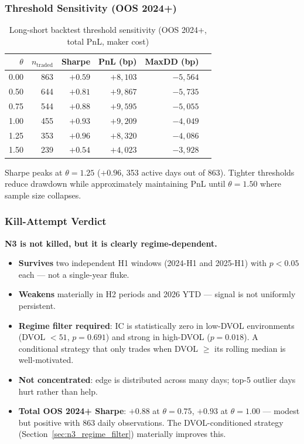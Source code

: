 \documentclass[12pt, a4paper]{article}
\theoremstyle{definition}
\begin{document}
\subsubsection{Threshold Sensitivity (OOS 2024+)}

\begin{table}[ht]
\centering
\caption{Long-short backtest threshold sensitivity (OOS 2024+, total PnL, maker cost)}
\label{tab:n3_thresh2}
\begin{tabular}{rrrrrr}
\toprule
$\theta$ & $n_{\text{traded}}$ & Sharpe & PnL (bp) & MaxDD (bp) \\
\midrule
0.00 & 863 & $+0.59$ & $+8{,}103$  & $-5{,}564$ \\
0.50 & 644 & $+0.81$ & $+9{,}867$  & $-5{,}735$ \\
0.75 & 544 & $+0.88$ & $+9{,}595$  & $-5{,}055$ \\
1.00 & 455 & $+0.93$ & $+9{,}209$  & $-4{,}049$ \\
1.25 & 353 & $+0.96$ & $+8{,}320$  & $-4{,}086$ \\
1.50 & 239 & $+0.54$ & $+4{,}023$  & $-3{,}928$ \\
\bottomrule
\end{tabular}
\end{table}

Sharpe peaks at $\theta = 1.25$ ($+0.96$, 353 active days out of 863).
Tighter thresholds reduce drawdown while approximately maintaining PnL
until $\theta = 1.50$ where sample size collapses.

\subsubsection{Kill-Attempt Verdict}

\textbf{N3 is not killed, but it is clearly regime-dependent.}

\begin{itemize}[noitemsep]
  \item \textbf{Survives} two independent H1 windows (2024-H1 and 2025-H1)
        with $p < 0.05$ each --- not a single-year fluke.
  \item \textbf{Weakens} materially in H2 periods and 2026 YTD --- signal is
        not uniformly persistent.
  \item \textbf{Regime filter required}: IC is statistically zero in low-DVOL
        environments (DVOL $< 51$, $p = 0.691$) and strong in high-DVOL
        ($p = 0.018$).  A conditional strategy that only trades when
        DVOL $\geq$ its rolling median is well-motivated.
  \item \textbf{Not concentrated}: edge is distributed across many days;
        top-5 outlier days hurt rather than help.
  \item \textbf{Total OOS 2024+ Sharpe}: $+0.88$ at $\theta = 0.75$,
        $+0.93$ at $\theta = 1.00$ --- modest but positive with 863 daily
        observations.  The DVOL-conditioned strategy (Section~\ref{sec:n3_regime_filter}) materially improves this.
\end{itemize}
\end{document}
